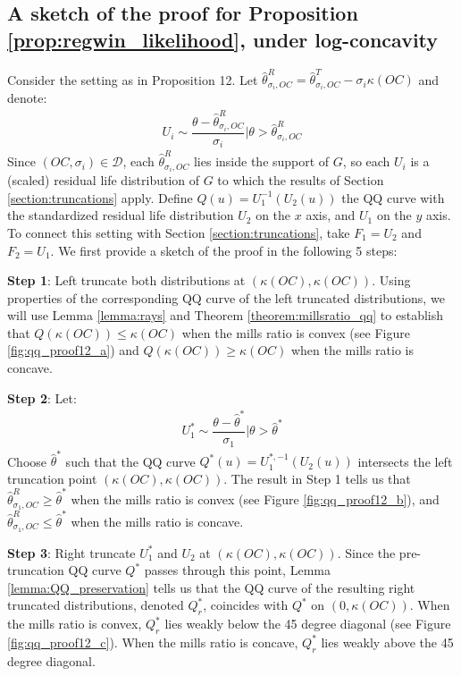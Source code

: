 \newpage
\subsection{A sketch of the proof for Proposition \ref{prop:regwin_likelihood}, under log-concavity}\label{section:proofsketch}



\noindent Consider the setting as in Proposition 12. Let $\hat{\theta}^R_{\sigma_i,OC} = \hat{\theta}^T_{\sigma_i,OC} - \sigma_i\kappa(OC)$ and denote:
\begin{align*}
    U_i \sim \dfrac{\theta - \hat{\theta}^R_{\sigma_i,OC}}{\sigma_i}|\theta > \hat{\theta}^R_{\sigma_i,OC}
\end{align*}
Since $(OC,\sigma_i)\in\mathcal{D}$, each $\hat{\theta}^R_{\sigma_i,OC}$ lies inside the support of $G$, so each $U_i$ is a (scaled) residual life distribution of $G$ to which the results of Section \ref{section:truncations} apply. Define $Q(u) = U_1^{-1}(U_2(u))$ the QQ curve with the standardized residual life distribution $U_2$ on the $x$ axis, and $U_1$ on the $y$ axis. To connect this setting with Section \ref{section:truncations}, take $F_1 = U_2$ and $F_2 = U_1$. We first provide a sketch of the proof in the following 5 steps:

\noindent \textbf{Step 1}: Left truncate both distributions at $(\kappa(OC),\kappa(OC))$. Using properties of the corresponding QQ curve of the left truncated distributions, we will use Lemma \ref{lemma:rays} and Theorem \ref{theorem:millsratio_qq} to establish that $Q(\kappa(OC))\leq\kappa(OC)$ when the mills ratio is convex (see Figure \ref{fig:qq_proof12_a}) and $Q(\kappa(OC))\geq\kappa(OC)$ when the mills ratio is concave. 

\noindent \textbf{Step 2}: Let:
\begin{align*}
    U_1^* \sim \dfrac{\theta - \hat{\theta}^*}{\sigma_1}|\theta > \hat{\theta}^*
\end{align*}
Choose $\hat{\theta}^*$ such that the QQ curve $Q^*(u) = U_1^{*,-1}(U_2(u))$ intersects the left truncation point $(\kappa(OC),\kappa(OC))$. The result in Step 1 tells us that $\hat{\theta}^{R}_{\sigma_1,OC}\geq \hat{\theta}^*$ when the mills ratio is convex (see Figure \ref{fig:qq_proof12_b}), and $\hat{\theta}^{R}_{\sigma_1,OC}\leq \hat{\theta}^*$ when the mills ratio is concave. 

\noindent \textbf{Step 3}: Right truncate $U_1^*$ and $U_2$ at $(\kappa(OC),\kappa(OC))$. Since the pre-truncation QQ curve $Q^*$ passes through this point, Lemma \ref{lemma:QQ_preservation} tells us that the QQ curve of the resulting right truncated distributions, denoted $Q^*_r$, coincides with $Q^*$ on $(0,\kappa(OC))$. When the mills ratio is convex, $Q^*_r$ lies weakly below the 45 degree diagonal (see Figure \ref{fig:qq_proof12_c}). When the mills ratio is concave, $Q^*_r$ lies weakly above the 45 degree diagonal. 


